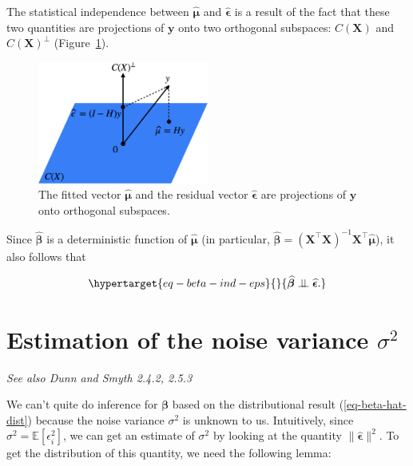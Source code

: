 \documentclass[
  11pt,
  letterpaper,
  oneside]{book}
\theoremstyle{plain}
\theoremstyle{plain}
\theoremstyle{definition}
\theoremstyle{definition}
\theoremstyle{plain}
\theoremstyle{remark}
\begin{document}
The statistical independence between \(\boldsymbol{\widehat{\mu}}\) and
\(\boldsymbol{\widehat{\epsilon}}\) is a result of the fact that these
two quantities are projections of \(\boldsymbol{y}\) onto two orthogonal
subspaces: \(C(\boldsymbol{X})\) and \(C(\boldsymbol{X})^\perp\)
(Figure~\ref{fig-orthogonality-fit-residuals}).

\begin{figure}

{\centering \includegraphics[width=0.5\textwidth,height=\textheight]{figures/orthogonality-fit-residuals.jpg}

}

\caption{\label{fig-orthogonality-fit-residuals}The fitted vector
\(\boldsymbol{\widehat{\mu}}\) and the residual vector
\(\boldsymbol{\widehat{\epsilon}}\) are projections of
\(\boldsymbol{y}\) onto orthogonal subspaces.}

\end{figure}

Since \(\boldsymbol{\widehat{\beta}}\) is a deterministic function of
\(\boldsymbol{\widehat{\mu}}\) (in particular,
\(\boldsymbol{\widehat{\beta}} = (\boldsymbol{X}^\top \boldsymbol{X})^{-1}\boldsymbol{X}^\top \boldsymbol{\widehat{\mu}}\)),
it also follows that

\begin{equation}\protect\hypertarget{eq-beta-ind-eps}{}{
\boldsymbol{\widehat{\beta}} \perp\!\!\!\perp \boldsymbol{\widehat{\epsilon}}.
}\label{eq-beta-ind-eps}\end{equation}

\hypertarget{sec-noise-estimation}{%
\section{\texorpdfstring{Estimation of the noise variance
\(\sigma^2\)}{Estimation of the noise variance \textbackslash sigma\^{}2}}\label{sec-noise-estimation}}

\emph{See also Dunn and Smyth 2.4.2, 2.5.3}

We can't quite do inference for \(\boldsymbol{\beta}\) based on the
distributional result (\ref{eq-beta-hat-dist}) because the noise
variance \(\sigma^2\) is unknown to us. Intuitively, since
\(\sigma^2 = \mathbb{E}[\epsilon_i^2]\), we can get an estimate of
\(\sigma^2\) by looking at the quantity
\(\|\boldsymbol{\widehat{\epsilon}}\|^2\). To get the distribution of
this quantity, we need the following lemma:
\end{document}
